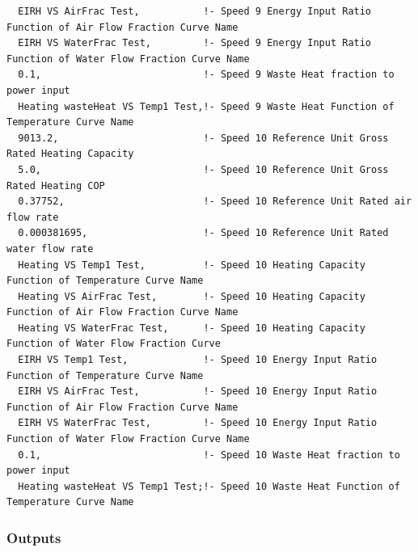 \begin{lstlisting}
  EIRH VS AirFrac Test,           !- Speed 9 Energy Input Ratio Function of Air Flow Fraction Curve Name
  EIRH VS WaterFrac Test,         !- Speed 9 Energy Input Ratio Function of Water Flow Fraction Curve Name
  0.1,                            !- Speed 9 Waste Heat fraction to power input
  Heating wasteHeat VS Temp1 Test,!- Speed 9 Waste Heat Function of Temperature Curve Name
  9013.2,                         !- Speed 10 Reference Unit Gross Rated Heating Capacity
  5.0,                            !- Speed 10 Reference Unit Gross Rated Heating COP
  0.37752,                        !- Speed 10 Reference Unit Rated air flow rate
  0.000381695,                    !- Speed 10 Reference Unit Rated water flow rate
  Heating VS Temp1 Test,          !- Speed 10 Heating Capacity Function of Temperature Curve Name
  Heating VS AirFrac Test,        !- Speed 10 Heating Capacity Function of Air Flow Fraction Curve Name
  Heating VS WaterFrac Test,      !- Speed 10 Heating Capacity Function of Water Flow Fraction Curve
  EIRH VS Temp1 Test,             !- Speed 10 Energy Input Ratio Function of Temperature Curve Name
  EIRH VS AirFrac Test,           !- Speed 10 Energy Input Ratio Function of Air Flow Fraction Curve Name
  EIRH VS WaterFrac Test,         !- Speed 10 Energy Input Ratio Function of Water Flow Fraction Curve Name
  0.1,                            !- Speed 10 Waste Heat fraction to power input
  Heating wasteHeat VS Temp1 Test;!- Speed 10 Waste Heat Function of Temperature Curve Name
\end{lstlisting}

\subsubsection{Outputs}\label{outputs-28}

